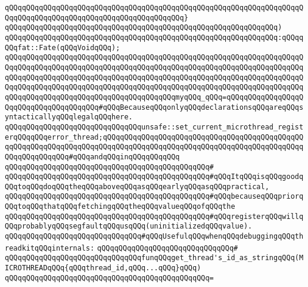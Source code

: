 \verb|qQQqqQQqqQQqqQQqqQQqqQQqqQQqqQQqqQQqqQQqqQQqqQQqqQQqqQQqqQQqqQQqqQQqqQQqqQQqqQQqqQQqqQQqqQQqqQQqqQQqqQQqqQQqqQQq}|\newline
\verb|qQQqqQQqqQQqqQQqqQQqqQQqqQQqqQQqqQQqqQQqqQQqqQQqqQQqqQQqqQQqqQQq)|\newline
\verb|qQQqqQQqqQQqqQQqqQQqqQQqqQQqqQQqqQQqqQQqqQQqqQQqqQQqqQQqqQQqqQQq:qQQqqQQqfat::Fate(qQQqVoidqQQq);|\newline
\newline
\verb|qQQqqQQqqQQqqQQqqQQqqQQqqQQqqQQqqQQqqQQqqQQqqQQqqQQqqQQqqQQqqQQqqQQqqQQqqQQqqQQqqQQqqQQqqQQqqQQqqQQqqQQqqQQqqQQqqQQqqQQqqQQqqQQqqQQqqQQqqQQqqQQqqQQqqQQqqQQqqQQqqQQqqQQqqQQqqQQqqQQqqQQqqQQqqQQqqQQqqQQqqQQqqQQqqQQqqQQqqQQqqQQqqQQqqQQqqQQqqQQqqQQqqQQqqQQqqQQqqQQqqQQqqQQqqQQqqQQqqQQqqQQqqQQqqQQqqQQqqQQqqQQqqQQqqQQqqQQqqQQqmyqQQq_qQQq=qQQqqQQqqQQqqQQqqQQqqQQqqQQqqQQqqQQqqQQq#qQQqBecauseqQQqonlyqQQqdeclarationsqQQqareqQQqsyntacticallyqQQqlegalqQQqhere.|\newline
\verb|qQQqqQQqqQQqqQQqqQQqqQQqqQQqqQQqunsafe::set_current_microthread_registerqQQqqQQqerror_thread;qQQqqQQqqQQqqQQqqQQqqQQqqQQqqQQqqQQqqQQqqQQqqQQqqQQqqQQqqQQqqQQqqQQqqQQqqQQqqQQqqQQqqQQqqQQqqQQqqQQqqQQqqQQqqQQqqQQqqQQqqQQqqQQqqQQq#qQQqandqQQqinqQQqqQQqqQQq|\newline
\verb|qQQqqQQqqQQqqQQqqQQqqQQqqQQqqQQqqQQqqQQqqQQqqQQq#|\newline
\verb|qQQqqQQqqQQqqQQqqQQqqQQqqQQqqQQqqQQqqQQqqQQqqQQq#qQQqItqQQqisqQQqgoodqQQqtoqQQqdoqQQqtheqQQqaboveqQQqasqQQqearlyqQQqasqQQqpractical,|\newline
\verb|qQQqqQQqqQQqqQQqqQQqqQQqqQQqqQQqqQQqqQQqqQQqqQQq#qQQqbecauseqQQqpriorqQQqtoqQQqthatqQQqfetchingqQQqtheqQQqvalueqQQqofqQQqthe|\newline
\verb|qQQqqQQqqQQqqQQqqQQqqQQqqQQqqQQqqQQqqQQqqQQqqQQq#qQQqregisterqQQqwillqQQqprobablyqQQqsegfaultqQQqusqQQq(uninitializedqQQqvalue).|\newline
\newline
\verb|qQQqqQQqqQQqqQQqqQQqqQQqqQQqqQQq#qQQqUsefulqQQqwhenqQQqdebuggingqQQqthreadkitqQQqinternals:|\newline
\verb|qQQqqQQqqQQqqQQqqQQqqQQqqQQqqQQq#|\newline
\verb|qQQqqQQqqQQqqQQqqQQqqQQqqQQqqQQqfunqQQqget_thread's_id_as_stringqQQq(MICROTHREADqQQq{qQQqthread_id,qQQq...qQQq}qQQq)|\newline
\verb|qQQqqQQqqQQqqQQqqQQqqQQqqQQqqQQqqQQqqQQqqQQqqQQq=|\newline

